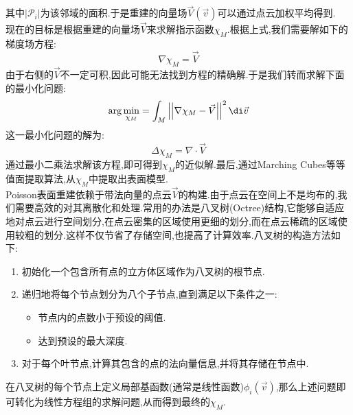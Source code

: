\documentclass{ctexart}
\begin{document}
其中$\left|\mathscr{P}_i\right|$为该邻域的面积.于是重建的向量场$\vec{V}(\vec{v})$可以通过点云加权平均得到.\\
\indent 现在的目标是根据重建的向量场$\vec{V}$来求解指示函数$\chi_M$.根据上式,我们需要解如下的梯度场方程:
\[\nabla\chi_M=\vec{V}\]
由于右侧的$\vec{V}$不一定可积,因此可能无法找到方程的精确解.于是我们转而求解下面的最小化问题:
\[\arg\min_{\chi_M}=\int_{M}\left|\left|\nabla\chi_M-\vec{V}\right|\right|^2\di\vec{v}\]
这一最小化问题的解为:
\[\Delta\chi_M=\nabla\cdot\vec{V}\]
通过最小二乘法求解该方程,即可得到$\chi_M$的近似解.最后,通过Marching Cubes等等值面提取算法,从$\chi_M$中提取出表面模型.\\
\indent Poisson表面重建依赖于带法向量的点云$\vec{V}$的构建.由于点云在空间上不是均布的,我们需要高效的对其离散化和处理.常用的办法是八叉树(Octree)结构,它能够自适应地对点云进行空间划分,在点云密集的区域使用更细的划分,而在点云稀疏的区域使用较粗的划分.这样不仅节省了存储空间,也提高了计算效率.八叉树的构造方法如下:
\begin{enumerate}[label=\tbf{\arabic*.},topsep=0pt,parsep=0pt,itemsep=0pt,partopsep=0pt]
    \item 初始化一个包含所有点的立方体区域作为八叉树的根节点.
    \item 递归地将每个节点划分为八个子节点,直到满足以下条件之一:
    \begin{itemize}[topsep=0pt,parsep=0pt,itemsep=0pt,partopsep=0pt]
        \item 节点内的点数小于预设的阈值.
        \item 达到预设的最大深度.
    \end{itemize}
    \item 对于每个叶节点,计算其包含的点的法向量信息,并将其存储在节点中.
\end{enumerate}
在八叉树的每个节点上定义局部基函数(通常是线性函数)$\phi_i(\vec{v})$,那么上述问题即可转化为线性方程组的求解问题,从而得到最终的$\chi_M$.
\end{document}
